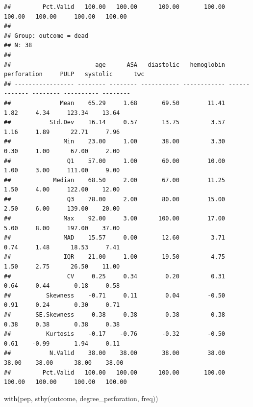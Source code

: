 \documentclass[
  10pt,
]{krantz}
\newenvironment{Shaded}{\begin{snugshade}}{\end{snugshade}}
\newcommand{\FunctionTok}[1]{\textcolor[rgb]{0.00,0.00,0.00}{#1}}
\newcommand{\NormalTok}[1]{#1}
\begin{document}
\begin{verbatim}
##         Pct.Valid   100.00   100.00      100.00       100.00        100.00   100.00     100.00   100.00
## 
## Group: outcome = dead  
## N: 38  
## 
##                        age      ASA   diastolic   hemoglobin   perforation     PULP   systolic      twc
## ----------------- -------- -------- ----------- ------------ ------------- -------- ---------- --------
##              Mean    65.29     1.68       69.50        11.41          1.82     4.34     123.34    13.64
##           Std.Dev    16.14     0.57       13.75         3.57          1.16     1.89      22.71     7.96
##               Min    23.00     1.00       38.00         3.30          0.30     1.00      67.00     2.00
##                Q1    57.00     1.00       60.00        10.00          1.00     3.00     111.00     9.00
##            Median    68.50     2.00       67.00        11.25          1.50     4.00     122.00    12.00
##                Q3    78.00     2.00       80.00        15.00          2.50     6.00     139.00    20.00
##               Max    92.00     3.00      100.00        17.00          5.00     8.00     197.00    37.00
##               MAD    15.57     0.00       12.60         3.71          0.74     1.48      18.53     7.41
##               IQR    21.00     1.00       19.50         4.75          1.50     2.75      26.50    11.00
##                CV     0.25     0.34        0.20         0.31          0.64     0.44       0.18     0.58
##          Skewness    -0.71     0.11        0.04        -0.50          0.91     0.24       0.30     0.71
##       SE.Skewness     0.38     0.38        0.38         0.38          0.38     0.38       0.38     0.38
##          Kurtosis    -0.17    -0.76       -0.32        -0.50          0.61    -0.99       1.94     0.11
##           N.Valid    38.00    38.00       38.00        38.00         38.00    38.00      38.00    38.00
##         Pct.Valid   100.00   100.00      100.00       100.00        100.00   100.00     100.00   100.00
\end{verbatim}

\begin{Shaded}
\begin{Highlighting}[]
\FunctionTok{with}\NormalTok{(pep, }\FunctionTok{stby}\NormalTok{(outcome, degree\_perforation, freq))}
\end{Highlighting}
\end{Shaded}
\end{document}
